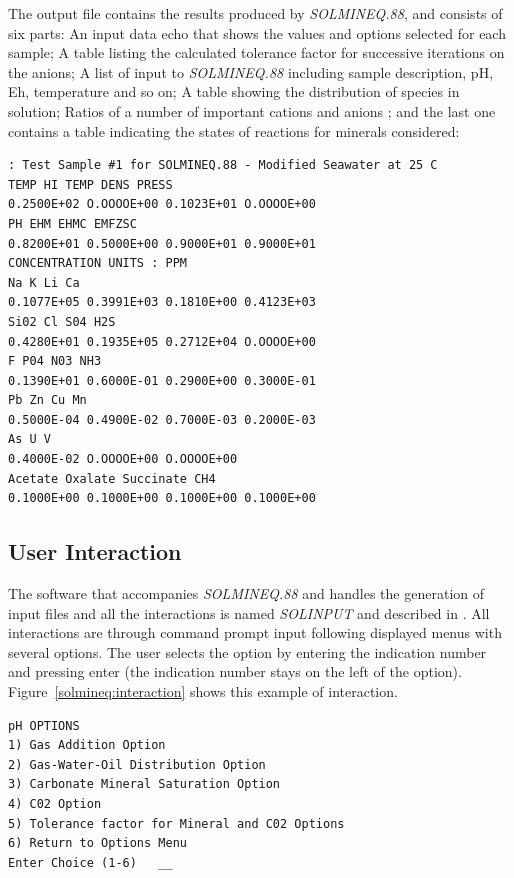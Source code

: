 The output file contains the results produced by \emph{SOLMINEQ.88}, and consists of six parts: An input data echo that shows the values and options selected for each sample; A table listing the calculated tolerance factor for successive iterations on the anions; A list of input to \emph{SOLMINEQ.88} including sample description, pH, Eh, temperature and so on; A table showing the distribution of species in solution; Ratios of a number of important cations and anions ; and the last one contains a table indicating the states of reactions for minerals considered:

\begin{minipage}[c]{0.92\textwidth}
\begin{lstlisting}[frame=single, caption=\emph{SOLMINEQ.88}'s excerpt from the output file, label=solmineq:output]
 : Test Sample #1 for SOLMINEQ.88 - Modified Seawater at 25 C
TEMP HI TEMP DENS PRESS
0.2500E+02 O.OOOOE+00 0.1023E+01 O.OOOOE+00
PH EHM EHMC EMFZSC
0.8200E+01 0.5000E+00 0.9000E+01 0.9000E+01
CONCENTRATION UNITS : PPM
Na K Li Ca
0.1077E+05 0.3991E+03 0.1810E+00 0.4123E+03
Si02 Cl S04 H2S
0.4280E+01 0.1935E+05 0.2712E+04 O.OOOOE+00
F P04 N03 NH3
0.1390E+01 0.6000E-01 0.2900E+00 0.3000E-01
Pb Zn Cu Mn
0.5000E-04 0.4900E-02 0.7000E-03 0.2000E-03
As U V
0.4000E-02 O.OOOOE+00 O.OOOOE+00
Acetate Oxalate Succinate CH4
0.1000E+00 0.1000E+00 0.1000E+00 0.1000E+00
\end{lstlisting}
\end{minipage}

\subsection{User Interaction}
The software that accompanies \emph{SOLMINEQ.88} and handles the generation of input files and all the interactions is named \emph{SOLINPUT} and described in \cite{Debraal:89}. All interactions are through command prompt input following displayed menus with several options. The user selects the option by entering the indication number and pressing enter (the indication number stays on the left of the option). Figure~\ref{solmineq:interaction} shows this example of interaction.

\begin{minipage}[c]{0.92\textwidth}
\begin{lstlisting}[frame=single, caption=\emph{SOLMINEQ.88}'s example of user interaction, label=solmineq:interaction]
	pH OPTIONS
1) Gas Addition Option
2) Gas-Water-Oil Distribution Option
3) Carbonate Mineral Saturation Option
4) C02 Option
5) Tolerance factor for Mineral and C02 Options
6) Return to Options Menu
Enter Choice (1-6)   __
\end{lstlisting}
\end{minipage}

